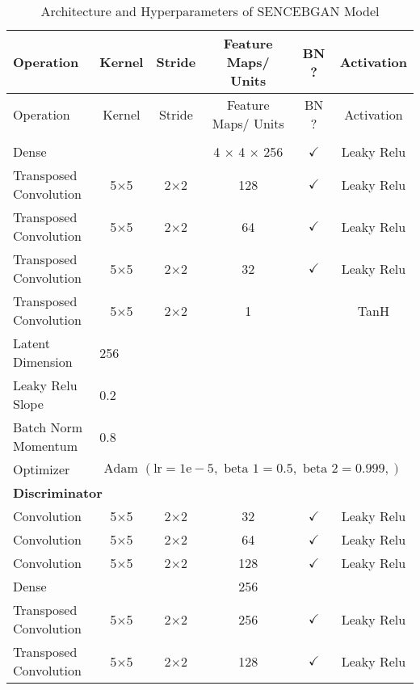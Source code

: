 \begin{longtable}[c]{@{}lccccc@{}}
	\caption{Architecture and Hyperparameters of SENCEBGAN Model}
	\label{tab:sencebgan_imp}\\
	\toprule
	Operation & Kernel & Stride & Feature Maps/ Units & BN ? & Activation \\* \midrule
	\endfirsthead
	\toprule
	Operation & Kernel & Stride & Feature Maps/ Units & BN ? & Activation \\* \midrule
	\endhead
	\bottomrule
	\endfoot
	\endlastfoot
		\multicolumn{6}{l}{\textbf{Generator}} \\
	Dense & \multicolumn{1}{c}{} &  & 4 $\times$ 4 $\times$ 256 & $\checkmark$ & Leaky Relu \\
	Transposed Convolution & \multicolumn{1}{c}{5$\times$5} & 2$\times$2 & 128 & $\checkmark$ & Leaky Relu \\
	Transposed Convolution & \multicolumn{1}{c}{5$\times$5} & 2$\times$2 & 64 & $\checkmark$ & Leaky Relu \\
	Transposed Convolution & \multicolumn{1}{c}{5$\times$5} & 2$\times$2 & 32 & $\checkmark$ & Leaky Relu \\
	Transposed Convolution & \multicolumn{1}{c}{5$\times$5} & 2$\times$2 & 1 &  & TanH\\
	Latent Dimension & \multicolumn{5}{l}{256} \\
	Leaky Relu Slope & \multicolumn{5}{l}{0.2} \\
	Batch Norm Momentum & \multicolumn{5}{l}{0.8} \\
	Optimizer & \multicolumn{5}{l}{$\text { Adam }(\mathrm{lr}=1 \mathrm{e}-5, \text { beta } 1=0.5, \text { beta } 2=0.999,)$} \\ \hline
	\multicolumn{6}{l}{\textbf{Discriminator}} \\
	Convolution & \multicolumn{1}{c}{5$\times$5} & 2$\times$2 & 32 & $\checkmark$ & Leaky Relu \\
	Convolution & \multicolumn{1}{c}{5$\times$5} & 2$\times$2 & 64 & $\checkmark$ & Leaky Relu \\
	Convolution & \multicolumn{1}{c}{5$\times$5} & 2$\times$2 & 128 & $\checkmark$ & Leaky Relu \\
	Dense & \multicolumn{1}{c}{} &  & 256 &  &  \\ \hline
	Transposed Convolution & \multicolumn{1}{c}{5$\times$5} & 2$\times$2 & 256 & $\checkmark$ & Leaky Relu \\
	Transposed Convolution & \multicolumn{1}{c}{5$\times$5} & 2$\times$2 & 128 & $\checkmark$ & Leaky Relu \\

\end{longtable}
